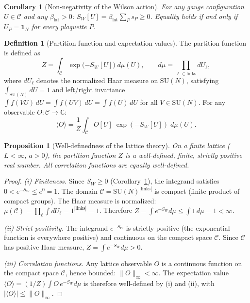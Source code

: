 \documentclass[12pt,a4paper]{article}
\theoremstyle{plain}
\newtheorem{corollary}[theorem]{Corollary}
\newtheorem{proposition}[theorem]{Proposition}
\theoremstyle{definition}
\newtheorem{definition}[theorem]{Definition}
\theoremstyle{remark}
\begin{document}
\begin{corollary}[Non-negativity of the Wilson action]\label{cor:SWnonneg}
For any gauge configuration $U\in\mathcal{C}$ and any $\beta_{\mathrm{lat}}>0$:
$S_W[U] = \beta_{\mathrm{lat}}\sum_P s_P \geq 0$.
Equality holds if and only if $U_P=\mathbf{1}_N$ for every plaquette $P$.
\end{corollary}

\begin{definition}[Partition function and expectation values]\label{def:Z}
The partition function is defined as
\begin{equation}\label{eq:Z}
Z = \int_{\mathcal{C}} \exp\!\big({-S_W[U]}\big)\;d\mu(U), \qquad d\mu = \prod_{\ell\in\mathrm{links}} dU_\ell,
\end{equation}
where $dU_\ell$ denotes the normalized Haar measure on $\mathrm{SU}(N)$, satisfying $\int_{\mathrm{SU}(N)} dU=1$ and left/right invariance $\int f(VU)\,dU=\int f(UV)\,dU=\int f(U)\,dU$ for all $V\in\mathrm{SU}(N)$. For any observable $O:\mathcal{C}\to\mathbb{C}$:
\begin{equation}
\langle O \rangle = \frac{1}{Z}\int_{\mathcal{C}} O[U]\;\exp({-S_W[U]})\;d\mu(U).
\end{equation}
\end{definition}

\begin{proposition}[Well-definedness of the lattice theory]\label{prop:wd}
On a finite lattice ($L<\infty$, $a>0$), the partition function $Z$ is a well-defined, finite, strictly positive real number. All correlation functions are equally well-defined.
\end{proposition}

\begin{proof}
\textit{(i) Finiteness.} Since $S_W\geq 0$ (Corollary~\ref{cor:SWnonneg}), the integrand satisfies $0<e^{-S_W}\leq e^0=1$. The domain $\mathcal{C}=\mathrm{SU}(N)^{|\mathrm{links}|}$ is compact (finite product of compact groups). The Haar measure is normalized: $\mu(\mathcal{C})=\prod_\ell\int dU_\ell=1^{|\mathrm{links}|}=1$. Therefore $Z=\int e^{-S_W}d\mu\leq\int 1\,d\mu=1<\infty$.

\textit{(ii) Strict positivity.} The integrand $e^{-S_W}$ is strictly positive (the exponential function is everywhere positive) and continuous on the compact space $\mathcal{C}$. Since $\mathcal{C}$ has positive Haar measure, $Z=\int e^{-S_W}d\mu>0$.

\textit{(iii) Correlation functions.} Any lattice observable $O$ is a continuous function on the compact space $\mathcal{C}$, hence bounded: $\|O\|_\infty<\infty$. The expectation value $\langle O\rangle=(1/Z)\int O\,e^{-S_W}d\mu$ is therefore well-defined by (i) and (ii), with $|\langle O\rangle|\leq\|O\|_\infty$.
\end{proof}
\end{document}
